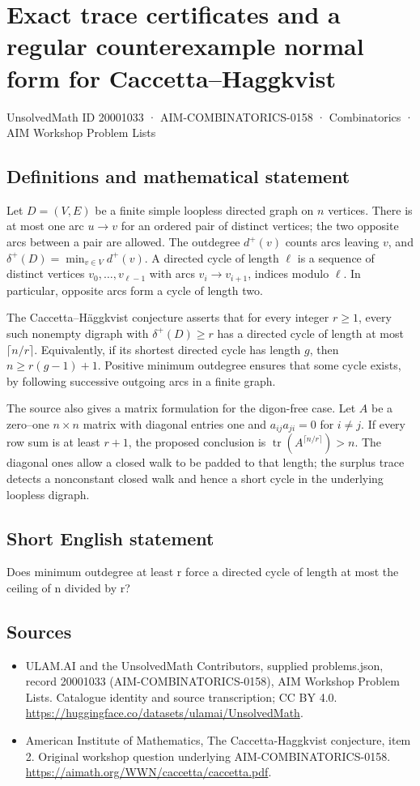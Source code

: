 \documentclass[11pt,a4paper]{article}
\begin{document}
\section*{Exact trace certificates and a regular counterexample normal form for Caccetta--Haggkvist}\label{20001033}
{\small UnsolvedMath ID 20001033 · AIM-COMBINATORICS-0158 · Combinatorics · AIM Workshop Problem Lists}
\subsection{Definitions and mathematical statement}
Let $D=(V,E)$ be a finite simple loopless directed graph on $n$ vertices.
There is at most one arc $u\to v$ for an ordered pair of distinct
vertices; the two opposite arcs between a pair are allowed.
The outdegree $d^+(v)$ counts arcs leaving $v$, and
$\delta^+(D)=\min_{v\in V}d^+(v)$.
A directed cycle of length $\ell$ is a sequence of distinct vertices
$v_0,\ldots,v_{\ell-1}$ with arcs $v_i\to v_{i+1}$, indices modulo
$\ell$. In particular, opposite arcs form a cycle of length two.

The Caccetta--H\"aggkvist conjecture asserts that for every integer
$r\ge1$, every such nonempty digraph with $\delta^+(D)\ge r$ has a
directed cycle of length at most $\lceil n/r\rceil$.
Equivalently, if its shortest directed cycle has length $g$, then
$n\ge r(g-1)+1$. Positive minimum outdegree ensures that some cycle
exists, by following successive outgoing arcs in a finite graph.

The source also gives a matrix formulation for the digon-free case.
Let $A$ be a zero--one $n\times n$ matrix with diagonal entries one
and $a_{ij}a_{ji}=0$ for $i\ne j$. If every row sum is at least
$r+1$, the proposed conclusion is
$\operatorname{tr}(A^{\lceil n/r\rceil})>n$.
The diagonal ones allow a closed walk to be padded to that length;
the surplus trace detects a nonconstant closed walk and hence a short
cycle in the underlying loopless digraph.
\subsection{Short English statement}
Does minimum outdegree at least r force a directed cycle of length at most the ceiling of n divided by r?
\subsection{Sources}
\begin{itemize}
\item[S1] ULAM.AI and the UnsolvedMath Contributors, supplied problems.json, record 20001033 (AIM-COMBINATORICS-0158), AIM Workshop Problem Lists. Catalogue identity and source transcription; CC BY 4.0.
\url{https://huggingface.co/datasets/ulamai/UnsolvedMath}.
\item[S2] American Institute of Mathematics, The Caccetta-Haggkvist conjecture, item 2. Original workshop question underlying AIM-COMBINATORICS-0158.
\url{https://aimath.org/WWN/caccetta/caccetta.pdf}.
\end{itemize}
\end{document}

